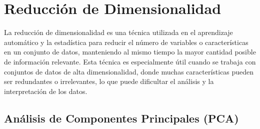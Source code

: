 \section{Reducción de Dimensionalidad}


La reducción de dimensionalidad es una técnica utilizada en el aprendizaje automático y la estadística para reducir el número de variables o características en un conjunto de datos, manteniendo al mismo tiempo la mayor cantidad posible de información relevante. Esta técnica es especialmente útil cuando se trabaja con conjuntos de datos de alta dimensionalidad, donde muchas características pueden ser redundantes o irrelevantes, lo que puede dificultar el análisis y la interpretación de los datos.

\subsection{Análisis de Componentes Principales (PCA)}

